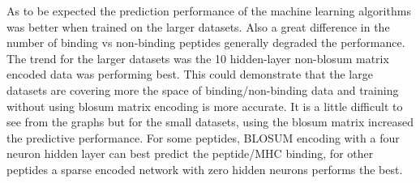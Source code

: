 As to be expected the prediction performance of the machine learning algorithms was better when trained on the larger datasets.
Also a great difference in the number of binding vs non-binding peptides generally degraded the performance.
The trend for the larger datasets was the 10 hidden-layer non-blosum matrix encoded data was performing best. 
This could demonstrate that the large datasets are covering more the space of binding/non-binding data and training without using blosum matrix encoding is more accurate.
It is a little difficult to see from the graphs but for the small datasets, using the blosum matrix increased the predictive performance.
For some peptides, BLOSUM encoding with a four
neuron hidden layer can best predict the
peptide/MHC binding, for other peptides a sparse
encoded network with zero hidden neurons performs
the best.
